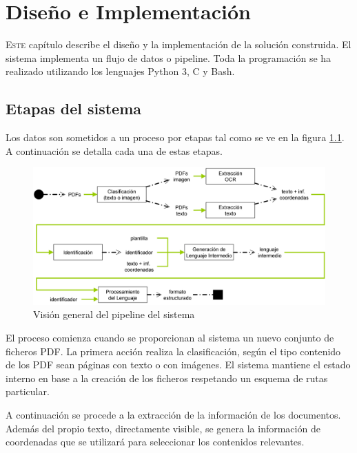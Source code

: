 
\chapter{Diseño e Implementación}
\label{chap:implemetación}

\lettrine{E}{ste} capítulo describe el diseño y la implementación de la solución construida. El sistema implementa un flujo de datos o pipeline. Toda la programación se ha realizado utilizando los lenguajes Python 3, C y Bash.

\section{Etapas del sistema}

Los datos son sometidos a un proceso por etapas tal como se ve en la figura \ref{fig:vision-general-del-sistema}. A continuación se detalla cada una de estas etapas.

\begin{figure}[hp!]
    \centering
    \includegraphics[width=1.0\textwidth]{imaxes/h-implementacion/vision-general-del-sistema-2}
    \caption{Visión general del pipeline del sistema}
    \label{fig:vision-general-del-sistema}
\end{figure}

El proceso comienza cuando se proporcionan al sistema un nuevo conjunto de ficheros PDF. La primera acción realiza la clasificación, según el tipo contenido de los PDF sean páginas con texto o con imágenes. El sistema mantiene el estado interno en base a la creación de los ficheros respetando un esquema de rutas particular.

A continuación se procede a la extracción de la información de los documentos. Además del propio texto, directamente visible, se genera la información de coordenadas que se utilizará para seleccionar los contenidos relevantes.

